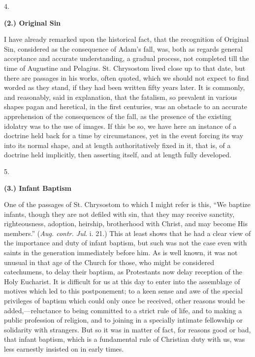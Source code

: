 4.

\textbf{(2.) Original Sin}

I have already remarked upon the historical fact, that
the recognition of Original Sin, considered as the
consequence of Adam's fall, was, both as regards general
acceptance and accurate understanding, a gradual process,
not completed till the time of Augustine and Pelagius.
St. Chrysostom lived close up to that date, but there are
passages in his works, often quoted, which we should not
expect to find worded as they stand, if they had been
written fifty years later. It is commonly, and
reasonably, said in explanation, that the fatalism, so
prevalent in various shapes pagan and heretical, in the
first centuries, was an obstacle to an accurate
apprehension of the consequences of the fall, as the
presence of the existing idolatry was to the use of
images. If this be so, we have here an instance of a
doctrine held back for a time by circumstances, yet in
the event forcing its way into its normal shape, and at
length authoritatively fixed in it, that is, of a
doctrine held implicitly, then asserting itself, and at
length fully developed.

5.

\textbf{(3.) Infant Baptism}

One of the passages of St. Chrysostom to which I might
refer is this, ``We baptize infants, though they are
not defiled with sin, that they may receive sanctity,
righteousness, adoption, heirship, brotherhood with
Christ, and may become His members.'' (\emph{Aug. contr.
Jul}. i. 21.) This at least shows that he had a clear
view of the importance and duty of infant baptism, but
such was not the case even with saints in the generation
immediately before him. As is well known, it was not
unusual in that age of the Church for those, who might be
considered catechumens, to delay their baptism, as
Protestants now delay reception of the Holy Eucharist. It
is difficult for us at this day to enter into the
assemblage of motives which led to this postponement; to
a keen sense and awe of the special privileges of baptism
which could only once be received, other reasons would be
added,—reluctance to being committed to a strict
rule of life, and to making a public profession of
religion, and to joining in a specially intimate
fellowship or solidarity with strangers. But so it was in
matter of fact, for reasons good or bad, that infant
baptism, which is a fundamental rule of Christian duty
with us, was less earnestly insisted on in early times.

